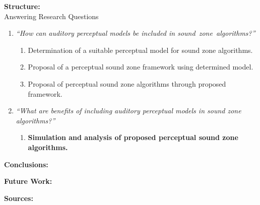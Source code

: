 \documentclass[aspectratio=169]{beamer}
\begin{document}
\begin{frame}{\textbf{Structure:}\\ Answering Research Questions}
    \begin{enumerate}
        \item {\textit{``How can auditory perceptual models be included in sound~zone~algorithms?''}}
            \vspace{7pt}
            \begin{enumerate}
                \item Determination of a suitable perceptual model for sound zone algorithms.
                \vspace{7pt}
                \item Proposal of a perceptual sound zone framework using determined model. 
                \vspace{7pt}
                \item Proposal of perceptual sound zone algorithms through proposed framework.
                \vspace{7pt}
            \end{enumerate}
        \item {\textit{``What are benefits of including auditory perceptual models in sound zone algorithms?''}}
            \vspace{-5pt}
            \begin{enumerate}
                \item \textbf{Simulation and analysis of proposed perceptual sound zone algorithms.}
            \end{enumerate}
    \end{enumerate}
\end{frame}

\begin{frame}{\textbf{Conclusions:}}
\end{frame}

\begin{frame}{\textbf{Future Work:}}
\end{frame}

\begin{frame}{\textbf{Sources:}}
    \printbibliography
\end{frame}
\end{document}
